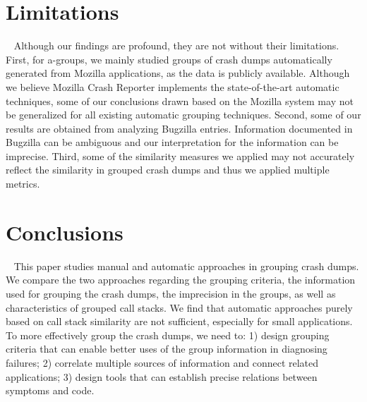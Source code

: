 \documentclass{llncs}
\begin{document}
\section{Limitations}~\label{sec:limitations}
Although our findings are profound, they are not without their limitations. First, for a-groups, we mainly studied groups of crash dumps automatically generated from Mozilla applications, as the data is publicly available. Although we believe Mozilla Crash Reporter implements the state-of-the-art automatic techniques, some of our conclusions drawn based on the Mozilla system may not be generalized for all existing automatic grouping techniques. Second, some of our results are obtained from analyzing Bugzilla entries. Information documented in Bugzilla can be ambiguous and our interpretation for the information can be imprecise. Third, some of the similarity measures we applied may not accurately reflect the similarity in grouped crash dumps and thus we applied multiple metrics.




\section{Conclusions}~\label{sec:conclusions}
This paper studies manual and automatic approaches in grouping crash dumps.  We compare the two approaches regarding the grouping criteria, the information used for grouping the crash dumps, the imprecision in the groups, as well as characteristics of grouped call stacks. We find that automatic approaches purely based on call stack similarity are not sufficient, especially for small applications. To more effectively group the crash dumps, we need to: 1) design grouping criteria that can enable better uses of the group information in diagnosing failures; 2) correlate multiple sources of information and connect related applications; 3) design tools that can establish precise relations between symptoms and code.



\
\end{document}
